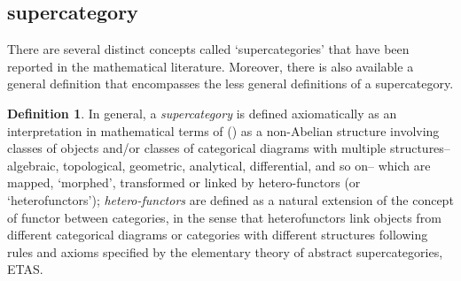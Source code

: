 \documentclass[12pt]{article}
\theoremstyle{plain}
\theoremstyle{definition}
\newtheorem{definition}{Definition}[section]
\numberwithin{equation}{section}
\begin{document}
\subsection{supercategory}
There are several distinct concepts called `supercategories' that have been reported in the mathematical literature. Moreover, there is also available a general definition that encompasses the less general definitions of a supercategory.

\begin{definition}
In general, a \emph{supercategory} is defined axiomatically as an interpretation in mathematical terms of 
 (\cite{Bib14to34}) as a non-Abelian structure involving classes of objects and/or classes of categorical diagrams with multiple structures-- algebraic, topological, geometric, analytical, differential, and so on-- which are mapped, `morphed', transformed or linked by hetero-functors (or `heterofunctors'); {\em hetero-functors} are defined as a natural extension of the concept of functor between categories, in the sense that heterofunctors link objects from different categorical diagrams or categories with different structures following rules and axioms specified by the elementary theory of abstract supercategories, ETAS.
\end{definition}
\end{document}
